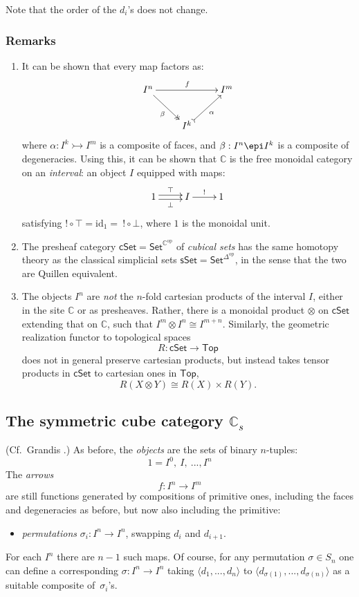 \documentclass[11pt]{article}
\newcommand{\C}{\ensuremath{\mathbb{C}}}
\newcommand{\psh}[1]{\ensuremath{\mathsf{Set}^{#1^{\mathrm{op}}}}}
\theoremstyle{remark}
\theoremstyle{definition}
\begin{document}
Note that the order of the $d_i$'s does not change.  

\subsubsection*{Remarks}
\begin{enumerate}
\item It can be shown that every map factors as:
\[
\xymatrix{
 I^n \ar[rr]^{f} \ar@{->>}[rd]_{\beta} && I^m\\
& I^k \ar@{>->}[ru]_{\alpha}  &
}
\]
where $\alpha : I^k \rightarrowtail I^m$ is a composite of faces, and $\beta : I^n \epi I^k$ is a composite of degeneracies.
Using this, it can be shown that $\mathbb{C}$ is the free monoidal category on an \emph{interval}: an object $I$ equipped with maps:
\[
\xymatrix{
 1 {\ar@<-.5ex>[r]_{\bot} \ar@<.5ex>[r]^{\top}} & I \ar[r]^{!} & 1
}
\]
satisfying $!\circ\top = \mathrm{id_1} =\ !\circ\bot$, where $1$ is the monoidal unit.

\item The presheaf category $\mathsf{cSet} = \psh{\C}$ of \emph{cubical sets} has the same homotopy theory as the classical simplicial sets $\mathsf{sSet} = \psh{\Delta}$, in the sense that the two are Quillen equivalent.

\item The objects $I^n$ are \emph{not} the $n$-fold cartesian products of the interval $I$, either in the site $\C$ or as presheaves.  Rather, there is a monoidal product $\otimes$ on $\mathsf{cSet}$ extending that on $\C$, such that $I^m\otimes I^n \cong I^{m+n}$.  Similarly, the geometric realization functor to topological spaces 
$$R: \mathsf{cSet} \to \mathsf{Top}$$
does not in general preserve cartesian products, but instead takes tensor products in $\mathsf{cSet}$ to cartesian ones in $\mathsf{Top}$, $$R(X\otimes Y) \cong R(X)\times R(Y).$$  
\end{enumerate}

\subsection{The symmetric cube category $\mathbb{C}_s$}

(Cf.\ Grandis \cite{Grandis??}.) As before, the \emph{objects} are the sets of binary $n$-tuples:
\[
1 = I^0,\ I,\ ..., I^n
\]
%
The \emph{arrows} $$f : I^n \to I^m$$ are still functions generated by compositions of primitive ones, including the faces and degeneracies as before, but now also including the primitive:
\begin{itemize}
\item \emph{permutations} $\sigma_i : I^n \to I^{n}$, swapping $d_i$ and $d_{i+1}$.
\end{itemize}
%
For each $I^n$ there are $n-1$ such maps. Of course, for any permutation $\sigma\in S_n$ one can define a corresponding $\sigma : I^n \to I^{n}$ taking $\langle d_1, ..., d_n\rangle$ to $\langle d_{\sigma{(1)}}, ..., d_{\sigma{(n)}}\rangle$ as a suitable composite of~$\sigma_i$'s.  
\end{document}
